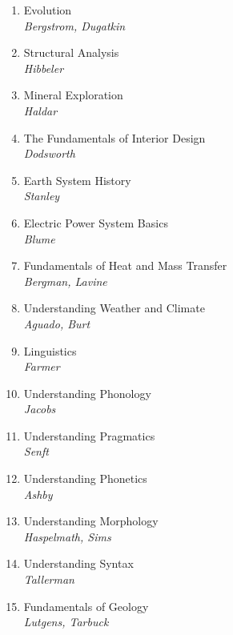 \documentclass[oneside, titlepage]{article}
\begin{document}
\begin{enumerate}
\item{Evolution\\ \itshape Bergstrom, Dugatkin}

\item{Structural Analysis\\ \itshape Hibbeler}

\item{Mineral Exploration\\ \itshape Haldar}

\item{The Fundamentals of Interior Design\\ \itshape Dodsworth}

\item{Earth System History\\ \itshape Stanley}

\item{Electric Power System Basics\\ \itshape Blume}

\item{Fundamentals of Heat and Mass Transfer\\ \itshape Bergman, Lavine}

\item{Understanding Weather and Climate\\ \itshape Aguado, Burt}

\item{Linguistics\\ \itshape Farmer}

\item{Understanding Phonology\\ \itshape Jacobs}

\item{Understanding Pragmatics\\ \itshape Senft}

\item{Understanding Phonetics\\ \itshape Ashby}

\item{Understanding Morphology\\ \itshape Haspelmath, Sims}

\item{Understanding Syntax\\ \itshape Tallerman}

\item{Fundamentals of Geology\\ \itshape Lutgens, Tarbuck}


\end{enumerate}
\end{document}
